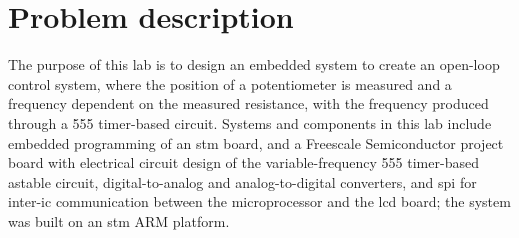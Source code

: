 
\section{Problem description}
The purpose of this lab is to design an embedded system to create an
open-loop control system, where the position of a potentiometer is
measured and a frequency dependent on the measured resistance, with the
frequency produced through a 555 timer-based circuit. Systems and
components in this lab include embedded programming of an \gls{stm}
board, and a Freescale Semiconductor project board with
electrical circuit design of the variable-frequency 555 timer-based
astable circuit, digital-to-analog and analog-to-digital converters, and
\gls{spi} for inter-\gls{ic} communication between the microprocessor
and the \gls{lcd} board; the system was built on an \gls{stm} ARM
platform.

